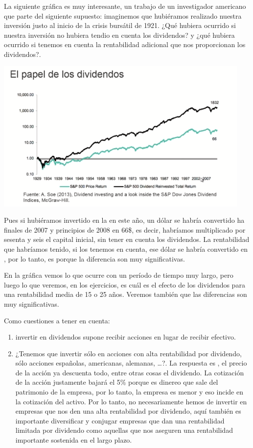 La siguiente gráfica es muy interesante, un trabajo de un investigador americano que parte del siguiente supuesto: imaginemos que hubiéramos realizado nuestra inversión justo al inicio de la crisis bursátil de 1921. ¿Qué hubiera ocurrido si nuestra inversión no hubiera tendio en cuenta los dividendos? y ¿qué hubiera ocurrido si tenemos en cuenta la rentabilidad adicional que nos proporcionan los dividendos?.
\begin{center}
    \includegraphics[scale=.80]{images/papel-dividendos2.png}
\end{center}
Pues si hubiéramos invertido en la  en este año, un dólar se habría convertido ha finales de 2007 y principios de 2008 en 66\$, es decir, habríamos multiplicado por sesenta y seis el capital inicial, sin tener en cuenta los dividendos. La rentabilidad que habríamos tenido, si los tenemos en cuenta, ese dólar se habría convertido en , por lo tanto, es  porque la diferencia son muy significativas.

En la gráfica vemos lo que ocurre con un período de tiempo muy largo, pero luego lo que veremos, en los ejercicios, es cuál es el efecto de los dividendos para una rentabilidad media de 15 o 25 años. Veremos también que las diferencias son muy significativas.

Como cuestiones a tener en cuenta:
\begin{enumerate}
    \item invertir en dividendos supone recibir acciones en lugar de recibir efectivo.
    \item ¿Tenemos que invertir sólo en acciones con alta rentabilidad por dividendo, sólo acciones españolas, americanas, alemanas, \ldots?. La respuesta es , el precio de la acción ya descuenta todo, entre otras cosas el dividendo. La cotización de la acción justamente bajará el 5\% porque es dinereo que sale del patrimonio de la empresa, por lo tanto, la empresa es menor y eso incide en la cotización del activo. 
    Por lo tanto, no necesariamente hemos de invertir en empresas que nos den una alta rentabilidad por dividendo, aquí también es importante diversificar y conjugar empresas que dan una rentabilidad limitada por dividendo como aquellas que nos aseguren una rentabilidad importante sostenida en el largo plazo.
\end{enumerate}
